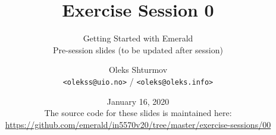 \documentclass[xcolor=table]{beamer}
\title{{\Large Exercise Session 0}}
\subtitle{Getting Started with Emerald\\Pre-session slides (to be updated after session)}
\institute{{University of Oslo}\\[0.2em] IN[59]570: Distributed Objects}
\author{Oleks Shturmov\\[-0.2em]%
  {\footnotesize \texttt{<olekss@uio.no>} / \texttt{<oleks@oleks.info>}}
}
\date{January 16, 2020\\[2em]
{\scriptsize The source code for these slides is maintained here: \\[-0.5em] {\tiny%
\url{https://github.com/emerald/in5570v20/tree/master/exercise-sessions/00}}%
}}
\begin{document}
\begin{frame} \titlepage \end{frame}




















\end{document}
